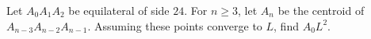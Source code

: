 Let $A_0A_1A_2$ be equilateral of side $24$. For $n\ge3$, let $A_n$ be the centroid of $A_{n-3}A_{n-2}A_{n-1}$. Assuming these points converge to $L$, find $A_0L^2$.

